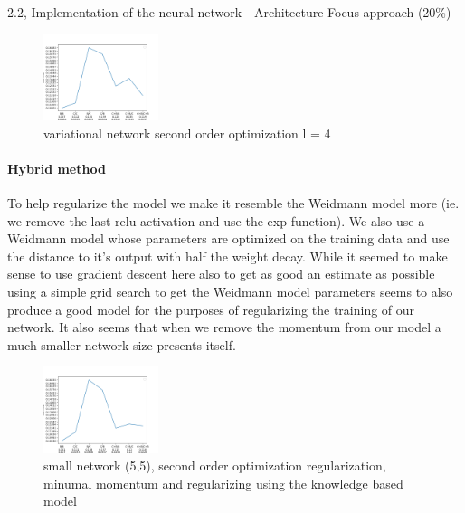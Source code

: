 \begin{task}{2.2, Implementation of the neural network - Architecture Focus approach (20\%)}
\begin{figure}
\begin{center}
\includegraphics[width=0.3\textwidth]{images/4-0.05.png}
\end{center}
\caption{variational network second order optimization l = 4}
\label{fig:variational}
\end{figure}

\paragraph{Hybrid method}
To help regularize the model we make it resemble the Weidmann model more (ie. we remove the last relu activation and use the exp function). We also use a Weidmann model whose parameters are optimized on the training data and use the distance to it's output with half the weight decay. While it seemed to make sense to use gradient descent here also to get as good an estimate as possible using a simple grid search to get the Weidmann model parameters seems to also produce a good model for the purposes of regularizing the training of our network. It also seems that when we remove the momentum from our model a much smaller network size presents itself.

\begin{figure}
\begin{center}
\includegraphics[width=0.3\textwidth]{images/5-5-0.05.png}
\end{center}
\caption{small network (5,5), second order optimization regularization, minumal momentum and regularizing using the knowledge based model}
\label{fig:hybrid}
\end{figure}


\end{task}
